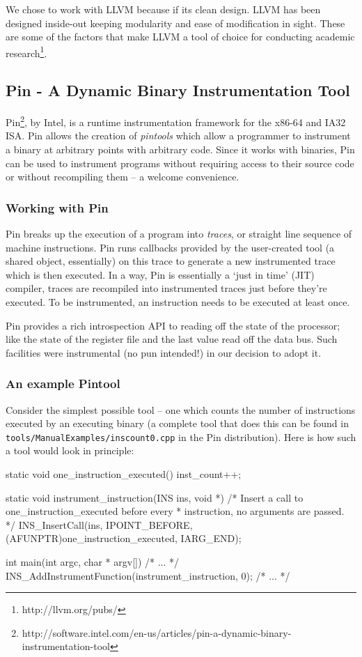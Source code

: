We chose to work with LLVM because if its clean design.  LLVM has been
designed inside-out keeping modularity and ease of modification in
sight.  These are some of the factors that make LLVM a tool of choice
for conducting academic research\footnote{http://llvm.org/pubs/}.

\subsection{Pin - A Dynamic Binary Instrumentation Tool}

Pin\footnote{http://software.intel.com/en-us/articles/pin-a-dynamic-binary-instrumentation-tool},
by Intel, is a runtime instrumentation framework for the x86-64 and
IA32 ISA.  Pin allows the creation of \textit{pintools} which allow a
programmer to instrument a binary at arbitrary points with arbitrary
code.  Since it works with binaries, Pin can be used to instrument
programs without requiring access to their source code or without
recompiling them -- a welcome convenience.

\subsubsection{Working with Pin}

Pin breaks up the execution of a program into \textit{traces}, or
straight line sequence of machine instructions.  Pin runs callbacks
provided by the user-created tool (a shared object, essentially) on
this trace to generate a new instrumented trace which is then
executed.  In a way, Pin is essentially a `just in time' (JIT)
compiler, traces are recompiled into instrumented traces just before
they're executed.  To be instrumented, an instruction needs to be
executed at least once.

Pin provides a rich introspection API to reading off the state of the
processor; like the state of the register file and the last value read
off the data bus.  Such facilities were instrumental (no pun
intended!) in our decision to adopt it.

\subsubsection{An example Pintool}

Consider the simplest possible tool -- one which counts the number of
instructions executed by an executing binary (a complete tool that
does this can be found in \texttt{tools/ManualExamples/inscount0.cpp}
in the Pin distribution).  Here is how such a tool would look in
principle:

\begin{ccode}
static void one_instruction_executed() {
  inst_count++;
}

static void instrument_instruction(INS ins, void *) {
  /* Insert a call to one_instruction_executed before every 
   * instruction, no arguments are passed.  */
  INS_InsertCall(ins, IPOINT_BEFORE, (AFUNPTR)one_instruction_executed, 
                  IARG_END);
}

int main(int argc, char * argv[]) {
  /* ... */
  INS_AddInstrumentFunction(instrument_instruction, 0);
  /* ... */
}
\end{ccode}
